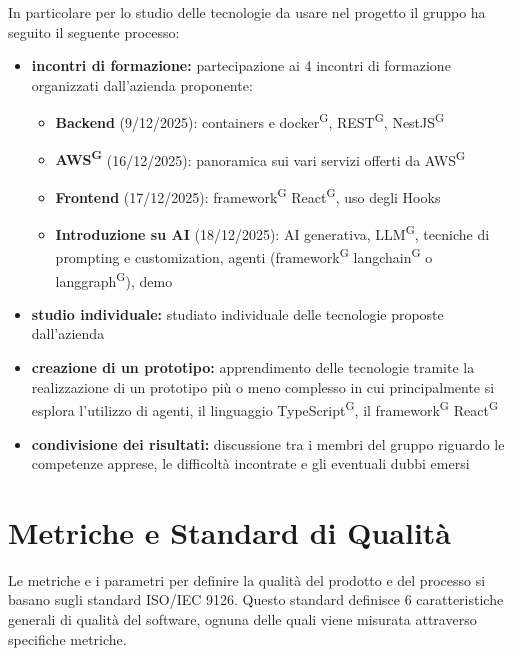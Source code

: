 \documentclass[a4paper, 11pt]{article}
\begin{document}
In particolare per lo studio delle tecnologie da usare nel progetto il gruppo ha seguito il seguente processo:
\begin{itemize}
    \item \textbf{incontri di formazione:} partecipazione ai 4 incontri di formazione organizzati dall'azienda proponente:
    \begin{itemize}
        \item \textbf{Backend} (9/12/2025): containers e docker\textsuperscript{G}, REST\textsuperscript{G}, NestJS\textsuperscript{G}
        \item \textbf{AWS\textsuperscript{G}} (16/12/2025): panoramica sui vari servizi offerti da AWS\textsuperscript{G}
        \item \textbf{Frontend} (17/12/2025): framework\textsuperscript{G} React\textsuperscript{G}, uso degli Hooks
        \item \textbf{Introduzione su AI} (18/12/2025): AI generativa, LLM\textsuperscript{G}, tecniche di prompting e customization, agenti (framework\textsuperscript{G} langchain\textsuperscript{G} o langgraph\textsuperscript{G}), demo
    \end{itemize}
    \item \textbf{studio individuale:} studiato individuale delle tecnologie proposte dall'azienda
    \item \textbf{creazione di un prototipo:} apprendimento delle tecnologie tramite la realizzazione di un prototipo più o meno complesso in cui principalmente si esplora l'utilizzo di agenti, il linguaggio TypeScript\textsuperscript{G}, il framework\textsuperscript{G} React\textsuperscript{G}
    \item \textbf{condivisione dei risultati:} discussione tra i membri del gruppo riguardo le competenze apprese, le difficoltà incontrate e gli eventuali dubbi emersi
\end{itemize}

\section{Metriche e Standard di Qualità}
Le metriche e i parametri per definire la qualità del prodotto e del processo si basano sugli standard ISO/IEC 9126.
Questo standard definisce 6 caratteristiche generali di qualità del software, ognuna delle quali viene misurata attraverso specifiche metriche.
\end{document}
